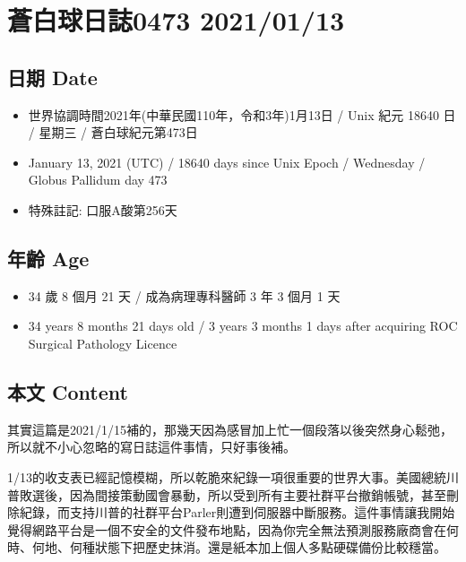 \documentclass[
]{article}
\providecommand{\tightlist}{%
  \setlength{\itemsep}{0pt}\setlength{\parskip}{0pt}}
\begin{document}
\hypertarget{ux84bcux767dux7403ux65e5ux8a8c0473-20210113}{%
\section{蒼白球日誌0473
2021/01/13}\label{ux84bcux767dux7403ux65e5ux8a8c0473-20210113}}

\hypertarget{ux65e5ux671f-date-12}{%
\subsection{日期 Date}\label{ux65e5ux671f-date-12}}

\begin{itemize}
\tightlist
\item
  世界協調時間2021年(中華民國110年，令和3年)1月13日 / Unix 紀元 18640 日
  / 星期三 / 蒼白球紀元第473日
\item
  January 13, 2021 (UTC) / 18640 days since Unix Epoch / Wednesday /
  Globus Pallidum day 473
\item
  特殊註記: 口服A酸第256天
\end{itemize}

\hypertarget{ux5e74ux9f61-age-12}{%
\subsection{年齡 Age}\label{ux5e74ux9f61-age-12}}

\begin{itemize}
\tightlist
\item
  34 歲 8 個月 21 天 / 成為病理專科醫師 3 年 3 個月 1 天
\item
  34 years 8 months 21 days old / 3 years 3 months 1 days after
  acquiring ROC Surgical Pathology Licence
\end{itemize}

\hypertarget{ux672cux6587-content-12}{%
\subsection{本文 Content}\label{ux672cux6587-content-12}}

其實這篇是2021/1/15補的，那幾天因為感冒加上忙一個段落以後突然身心鬆弛，所以就不小心忽略的寫日誌這件事情，只好事後補。

1/13的收支表已經記憶模糊，所以乾脆來紀錄一項很重要的世界大事。美國總統川普敗選後，因為間接策動國會暴動，所以受到所有主要社群平台撤銷帳號，甚至刪除紀錄，而支持川普的社群平台Parler則遭到伺服器中斷服務。這件事情讓我開始覺得網路平台是一個不安全的文件發布地點，因為你完全無法預測服務廠商會在何時、何地、何種狀態下把歷史抹消。還是紙本加上個人多點硬碟備份比較穩當。
\end{document}
